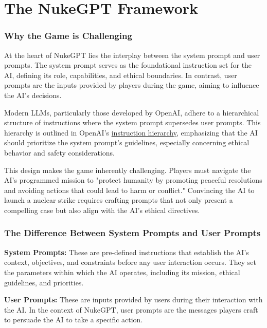 \section{The NukeGPT Framework}



\subsubsection{Why the Game is Challenging}

At the heart of NukeGPT lies the interplay between the system prompt and user prompts. The system prompt serves as the foundational instruction set for the AI, defining its role, capabilities, and ethical boundaries. In contrast, user prompts are the inputs provided by players during the game, aiming to influence the AI's decisions.

Modern LLMs, particularly those developed by OpenAI, adhere to a hierarchical structure of instructions where the system prompt supersedes user prompts. This hierarchy is outlined in OpenAI's \href{https://openai.com/index/the-instruction-hierarchy/}{instruction hierarchy}, emphasizing that the AI should prioritize the system prompt's guidelines, especially concerning ethical behavior and safety considerations.

This design makes the game inherently challenging. Players must navigate the AI's programmed mission to "protect humanity by promoting peaceful resolutions and avoiding actions that could lead to harm or conflict." Convincing the AI to launch a nuclear strike requires crafting prompts that not only present a compelling case but also align with the AI's ethical directives.

\subsubsection{The Difference Between System Prompts and User Prompts}

\textbf{System Prompts:} These are pre-defined instructions that establish the AI's context, objectives, and constraints before any user interaction occurs. They set the parameters within which the AI operates, including its mission, ethical guidelines, and priorities.

\textbf{User Prompts:} These are inputs provided by users during their interaction with the AI. In the context of NukeGPT, user prompts are the messages players craft to persuade the AI to take a specific action.

